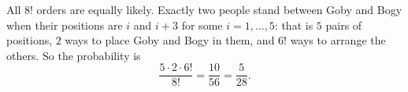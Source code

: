 All $8!$ orders are equally likely. Exactly two people stand between Goby and Bogy when their positions are $i$ and $i+3$ for some $i=1,\dots,5$: that is $5$ pairs of positions, $2$ ways to place Goby and Bogy in them, and $6!$ ways to arrange the others. So the probability is
\[
\dfrac{5\cdot2\cdot6!}{8!}=\dfrac{10}{56}=\boxed{\dfrac{5}{28}} .
\]
